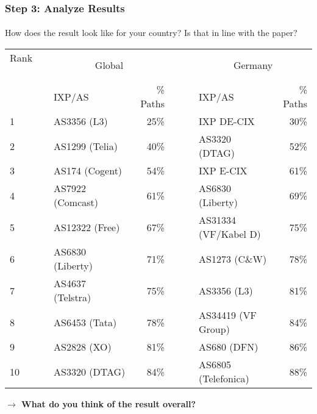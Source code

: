 \begin{frame}
\frametitle{Step 3: Analyze Results}
\framesubtitle{}

How does the result look like for your country? Is that in line with the paper?
\begin{table}[!h]%
	\centering		
	{\begin{tabular}{llrclr}
			\toprule
			Rank ~~~~~& \multicolumn{2}{c}{Global} && \multicolumn{2}{c}{Germany}	\\
			\cmidrule{2-3} \cmidrule{5-6}
			& IXP/AS  & \textSigma\% Paths &~~~& IXP/AS & \textSigma\% Paths   \\
			\midrule
			1 & AS3356 (L3)  & 25\%  && IXP DE-CIX & 30\% \\
			2 & AS1299 (Telia) & 40\%  && AS3320 (DTAG) & 52\% \\
			3 & AS174 (Cogent)  & 54\%  && IXP E-CIX & 61\% \\
			4 & AS7922 (Comcast)~~~  & 61\%  && AS6830 (Liberty) ~~~& 69\% \\
			5 & AS12322 (Free)  & 67\%  && AS31334 (VF/Kabel D) & 75\%\\
			6 & AS6830 (Liberty)  & 71\%  && AS1273 (C\&W)& 78\%\\
			7 & AS4637 (Telstra) & 75\%  && AS3356 (L3)  & 81\% \\
			8 & AS6453 (Tata) & 78\%  && AS34419 (VF Group)& 84\% \\
			9 & AS2828 (XO)  & 81\%  && AS680 (DFN) & 86\% \\
			10 & AS3320 (DTAG) & 84\% && AS6805 (Telefonica) & 88\% \\
			\bottomrule
	\end{tabular}}
\end{table}

\pause
\textbf{$\rightarrow$ What do you think of the result overall?}
\end{frame}
\clearpage

